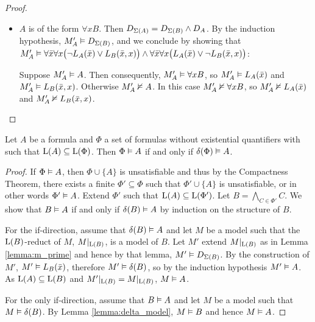 \begin{proof}
\begin{itemize}
		\item $A$ is of the form $\forall x B$.
			Then $D_{\Sigma(A)} =
			D_{\Sigma(B)} \land D_A$.
			By the induction hypothesis,  $M_A' \vDash D_{\Sigma(B)}$, and we conclude by showing that $M_A' \vDash \forall \bar x \forall x \big(\lnot L_A(\bar x) \lor L_B(\bar x, x)\big) \land \forall \bar x \forall x \big(L_A(\bar x) \lor \lnot L_B(\bar x, x)\big)$:


			Suppose $M_A' \vDash A$. Then consequently, $M_A' \vDash \forall x B$, so $M_A' \vDash L_A(\bar x)$ and $M_A' \vDash L_B(\bar x, x)$.
			Otherwise $M_A' \nvDash A$. In this case $M_A' \nvDash \forall x B$, so $M_A' \nvDash L_A(\bar x)$ and $M_A' \nvDash L_B(\bar x, x)$.
			\qedhere
	\end{itemize}

\end{proof}




\begin{lemma}
	\label{lemma:definitional}
	Let $A$ be a formula and $\Phi$ a set of formulas without existential quantifiers with such that $\operatorname{L}(A) \subseteq \operatorname{L}(\Phi)$.
	Then $\Phi \vDash A$ if and only if $\delta(\Phi) \vDash A$.
\end{lemma}
\begin{proof}
	If $\Phi \vDash A$, then $\Phi \cup \{A\}$ is unsatisfiable and thus by the Compactness Theorem,
	there exists a finite $\Phi' \subseteq \Phi$ such that $\Phi' \cup \{A\}$ is unsatisfiable, or in other words $\Phi' \vDash A$.
	Extend $\Phi'$ such that $\operatorname{L}(A) \subseteq \operatorname{L}(\Phi')$.
	Let $B = \bigwedge_{C\in \Phi'} C$.
	We show that $B \vDash A$ if and only if $\delta(B) \vDash A$ by induction on the structure of $B$.

	For the if-direction, assume that $\delta(B) \vDash A$ and let $M$ be a model 
	such that the $\operatorname{L}(B)$-reduct of $M$, $M|_{\operatorname{L}(B)}$, is a model of $B$.
	Let $M'$ extend $M|_{\operatorname{L}(B)}$ as in Lemma \ref{lemma:m_prime} and hence by that lemma, $M' \vDash D_{\Sigma(B)}$.
	By the construction of $M'$, $M' \vDash L_B(\bar x)$, therefore $M' \vDash \delta(B)$, so by the induction hypothesis $M' \vDash A$. 
	As $\operatorname{L}(A) \subseteq \operatorname{L}(B)$ and $M'|_{\operatorname{L}(B)} = M|_{\operatorname{L}(B)}$, $M \vDash A$.

	For the only if-direction, assume that $B \vDash A$ and let $M$ be a model such that $M\vDash \delta(B)$.  
	By Lemma \ref{lemma:delta_model}, $M\vDash B$ and hence $M\vDash A$.
\end{proof}


